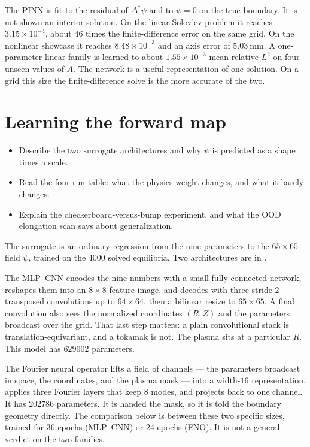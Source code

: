 \documentclass[11pt,a4paper,oneside,openany]{book}
\newcommand{\code}{\path}
\numberwithin{equation}{chapter}
\newcommand{\Dstar}{\Delta^{*}}
\theoremstyle{definition}
\begin{document}
\begin{keyideas}
The PINN is fit to the residual of \(\Dstar\psi\) and to \(\psi=0\) on the true boundary. It is not shown an interior solution. On the linear Solov'ev problem it reaches \(3.15\times 10^{-4}\), about \(46\) times the finite-difference error on the same grid. On the nonlinear showcase it reaches \(8.48\times 10^{-3}\) and an axis error of \(\qty{5.03}{\milli\metre}\). A one-parameter linear family is learned to about \(1.55\times 10^{-3}\) mean relative \(L^{2}\) on four unseen values of \(A\). The network is a useful representation of one solution. On a grid this size the finite-difference solve is the more accurate of the two.
\end{keyideas}

\chapter{Learning the forward map}
\label{ch:surrogate}

\begin{objectives}
\begin{itemize}[leftmargin=1.2em]
\item Describe the two surrogate architectures and why \(\psi\) is predicted as a shape times a scale.
\item Read the four-run table: what the physics weight changes, and what it barely changes.
\item Explain the checkerboard-versus-bump experiment, and what the OOD elongation scan says about generalization.
\end{itemize}
\end{objectives}

The surrogate is an ordinary regression from the nine parameters to the \(65\times 65\) field \(\psi\), trained on the \(4000\) solved equilibria. Two architectures are in \code{models/surrogate.py}.

The MLP--CNN encodes the nine numbers with a small fully connected network, reshapes them into an \(8\times 8\) feature image, and decodes with three stride-2 transposed convolutions up to \(64\times 64\), then a bilinear resize to \(65\times 65\). A final convolution also sees the normalized coordinates \((R,Z)\) and the parameters broadcast over the grid. That last step matters: a plain convolutional stack is translation-equivariant, and a tokamak is not. The plasma sits at a particular \(R\). This model has \(629002\) parameters.

The Fourier neural operator lifts a field of channels --- the parameters broadcast in space, the coordinates, and the plasma mask --- into a width-\(16\) representation, applies three Fourier layers that keep \(8\) modes, and projects back to one channel. It has \(202786\) parameters. It is handed the mask, so it is told the boundary geometry directly. The comparison below is between these two specific sizes, trained for \(36\) epochs (MLP--CNN) or \(24\) epochs (FNO). It is not a general verdict on the two families.
\end{document}
